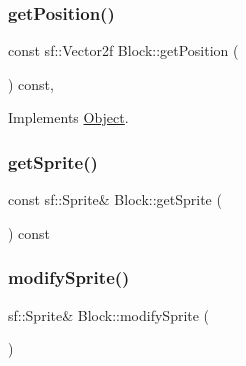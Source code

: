 \mbox{\label{class_block_ae7621aaed284804fc898174207eb1587}} 
\subsubsection{\texorpdfstring{getPosition()}{getPosition()}}
{\footnotesize\ttfamily const sf\+::\+Vector2f Block\+::get\+Position (\begin{DoxyParamCaption}{ }\end{DoxyParamCaption}) const\hspace{0.3cm}{\ttfamily [inline]}, {\ttfamily [virtual]}}



Implements \mbox{\hyperlink{class_object_a3fd6370b8cfc53e5e41d09704726c2d4}{Object}}.

\mbox{\label{class_block_a40e27a756a586c9784d4023163bf92ef}} 
\subsubsection{\texorpdfstring{getSprite()}{getSprite()}}
{\footnotesize\ttfamily const sf\+::\+Sprite\& Block\+::get\+Sprite (\begin{DoxyParamCaption}{ }\end{DoxyParamCaption}) const\hspace{0.3cm}{\ttfamily [inline]}}

\mbox{\label{class_block_affece2c491813eba0583a9deeee9d925}} 
\subsubsection{\texorpdfstring{modifySprite()}{modifySprite()}}
{\footnotesize\ttfamily sf\+::\+Sprite\& Block\+::modify\+Sprite (\begin{DoxyParamCaption}{ }\end{DoxyParamCaption})\hspace{0.3cm}{\ttfamily [inline]}}

\mbox{\label{class_block_a9c4782f321b4760d572a01bd31c42a06}} 

